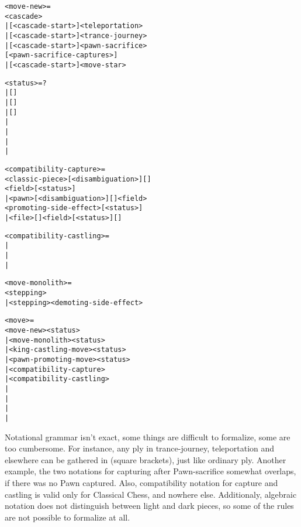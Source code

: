 \clearpage %

\begin{alltt}
<move-new> =
  <cascade>
| [<cascade-start>\alg{~}]<teleportation>
| [<cascade-start>\alg{~}]<trance-journey>
| [<cascade-start>\alg{~}]<pawn-sacrifice>
    [<pawn-sacrifice-captures>]
| [<cascade-start>\alg{~}]<move-star>

<status> = ?
         | [\alg{+}]
         | [\alg{+}]\alg{(=)}
         | [\alg{+}]\alg{(-)}
         | \alg{#}
         | \algcty{++}
         | \alg{(=)}
         | \alg{(-)}

<compatibility-capture> =
  <classic-piece>[<disambiguation>][]
    <field>[<status>]
| <pawn>[<disambiguation>][]<field>
    <promoting-side-effect>[<status>]
| <file>[]<field>[<status>][]

<compatibility-castling> =
| 
| 
| 

<move-monolith> =
  <stepping>
| <stepping><demoting-side-effect>
\end{alltt}

\clearpage %

\begin{alltt}
<move> =
  <move-new><status>
| <move-monolith><status>
| <king-castling-move><status>
| <pawn-promoting-move><status>
| <compatibility-capture>
| <compatibility-castling>
| \alg{#}
| \alg{##}
| \alg{(==)}
| \alg{(===)}
\end{alltt}


Notational grammar isn't exact, some things are difficult to formalize, some are
too cumbersome. For instance, any ply in trance-journey, teleportation and
elsewhere can be gathered in \alg{[ ]} (square brackets), just like ordinary ply.
Another example, the two notations for capturing after Pawn-sacrifice somewhat
overlaps, if there was no Pawn captured. Also, compatibility notation for capture
and castling is valid only for Classical Chess, and nowhere else. Additionaly,
algebraic notation does not distinguish between light and dark pieces, so some
of the rules are not possible to formalize at all.

\clearpage %
